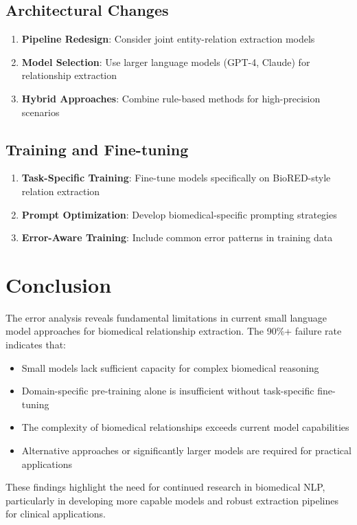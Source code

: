 \subsection{Architectural Changes}
\begin{enumerate}
    \item \textbf{Pipeline Redesign}: Consider joint entity-relation extraction models
    \item \textbf{Model Selection}: Use larger language models (GPT-4, Claude) for relationship extraction
    \item \textbf{Hybrid Approaches}: Combine rule-based methods for high-precision scenarios
\end{enumerate}

\subsection{Training and Fine-tuning}
\begin{enumerate}
    \item \textbf{Task-Specific Training}: Fine-tune models specifically on BioRED-style relation extraction
    \item \textbf{Prompt Optimization}: Develop biomedical-specific prompting strategies
    \item \textbf{Error-Aware Training}: Include common error patterns in training data
\end{enumerate}

\section{Conclusion}

The error analysis reveals fundamental limitations in current small language model approaches for biomedical relationship extraction. The 90\%+ failure rate indicates that:

\begin{itemize}
    \item Small models lack sufficient capacity for complex biomedical reasoning
    \item Domain-specific pre-training alone is insufficient without task-specific fine-tuning
    \item The complexity of biomedical relationships exceeds current model capabilities
    \item Alternative approaches or significantly larger models are required for practical applications
\end{itemize}

These findings highlight the need for continued research in biomedical NLP, particularly in developing more capable models and robust extraction pipelines for clinical applications.